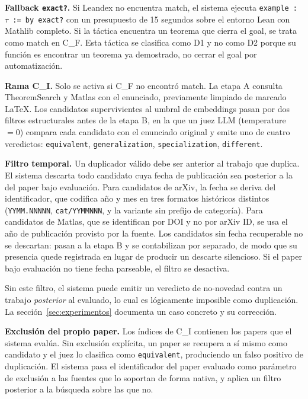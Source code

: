 \documentclass[12pt,a4paper]{article}
\theoremstyle{remark}
\begin{document}
\textbf{Fallback \texttt{exact?}.} Si Leandex no encuentra match, el sistema ejecuta \texttt{example : $\tau$ := by exact?} con un presupuesto de 15 segundos sobre el entorno Lean con Mathlib completo. Si la táctica encuentra un teorema que cierra el goal, se trata como match en C\_F. Esta táctica se clasifica como D1 y no como D2 porque su función es encontrar un teorema ya demostrado, no cerrar el goal por automatización.

\textbf{Rama C\_I.} Solo se activa si C\_F no encontró match. La etapa A consulta TheoremSearch y Matlas con el enunciado, previamente limpiado de marcado LaTeX. Los candidatos supervivientes al umbral de embeddings pasan por dos filtros estructurales antes de la etapa B, en la que un juez LLM (temperature $=0$) compara cada candidato con el enunciado original y emite uno de cuatro veredictos: \texttt{equivalent}, \texttt{generalization}, \texttt{specialization}, \texttt{different}.

\textbf{Filtro temporal.} Un duplicador válido debe ser anterior al trabajo que duplica. El sistema descarta todo candidato cuya fecha de publicación sea posterior a la del paper bajo evaluación. Para candidatos de arXiv, la fecha se deriva del identificador, que codifica año y mes en tres formatos históricos distintos (\texttt{YYMM.NNNNN}, \texttt{cat/YYMMNNN}, y la variante sin prefijo de categoría). Para candidatos de Matlas, que se identifican por DOI y no por arXiv ID, se usa el año de publicación provisto por la fuente. Los candidatos sin fecha recuperable no se descartan: pasan a la etapa B y se contabilizan por separado, de modo que su presencia quede registrada en lugar de producir un descarte silencioso. Si el paper bajo evaluación no tiene fecha parseable, el filtro se desactiva.

Sin este filtro, el sistema puede emitir un veredicto de no-novedad contra un trabajo \textit{posterior} al evaluado, lo cual es lógicamente imposible como duplicación. La sección~\ref{sec:experimentos} documenta un caso concreto y su corrección.

\textbf{Exclusión del propio paper.} Los índices de C\_I contienen los papers que el sistema evalúa. Sin exclusión explícita, un paper se recupera a sí mismo como candidato y el juez lo clasifica como \texttt{equivalent}, produciendo un falso positivo de duplicación. El sistema pasa el identificador del paper evaluado como parámetro de exclusión a las fuentes que lo soportan de forma nativa, y aplica un filtro posterior a la búsqueda sobre las que no.
\end{document}
